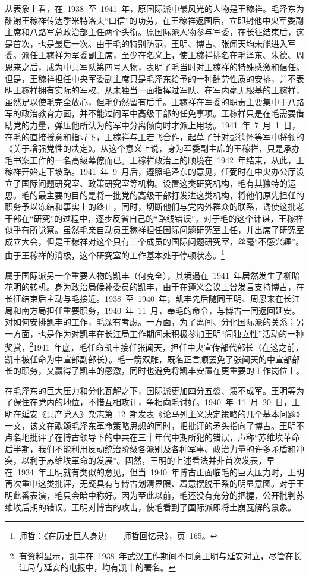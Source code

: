 从表象上看，在~1938~至~1941~年，原国际派中最风光的人物是王稼祥。毛泽东为酬谢王稼祥传达季米特洛夫“口信”的功劳，在王稼祥返国后，立即封他中央军委副主席和八路军总政治部主任两个头衔。原国际派人物参与军委，在长征结束后，这是首次，也是最后一次。由于毛的特别防范，王明、博古、张闻天均未能进入军委。派任王稼祥为军委副主席，至少在名义上，使王稼祥排名在毛泽东、朱德、周恩来之后，成为中共军队第四号人物，表明了毛当时对王稼祥的特殊感激和信任。但是，王稼祥担任中央军委副主席只是毛泽东给予的一种酬劳性质的安排，并不表明王稼祥拥有实际的军权。从未独当一面指挥过军队、在军内毫无根基的王稼祥，虽然足以使毛完全放心，但毛仍然留有后手。王稼祥在军委的职责主要集中于八路军的政治教育方面，并不能过问军中高级干部的任免事项。王稼祥只是在毛需要借助党的力量，弹压他所认为的军中分离倾向时才派上用场。1941~年~7~月~1~日，在毛的直接授意和指导下，王稼祥与王若飞合作，起草了针对彭德怀等军中将领的《关于增强党性的决定》。从这个意义上说，身为军委副主席的王稼祥，只是承办毛书案工作的一名高级幕僚而已。王稼祥政治上的顺境在~1942~年结束，从此，王稼祥开始走下坡路。1941~年~9~月后，遵照毛泽东的意见，任弼时在中央办公厅设立了国际问题研究室、政策研究室等机构。设置这类研究机构，毛有其独特的运思。毛的最主要的目的是将一批党的高级干部打发进这类机构，将他们原先担任的职务予以冻结和事实上的终止，同时，切断他们与党内外群众的联系，诱使这批老干部在“研究”的过程中，逐步反省自己的“路线错误”。对于毛的这个计谋，王稼祥似乎有所觉察。虽然毛亲自动员王稼祥担任国际问题研究室主任，并出席了研究室成立大会，但是王稼祥对这个只有三个成员的国际问题研究室，丝毫“不感兴趣”。由于王稼祥的消极，这个研究室的工作基本处于停顿状态。\footnote{师哲：《在历史巨人身边——师哲回忆录》，页~165。}

属于国际派另一个重要人物的凯丰（何克全），其境遇在~1941~年居然发生了柳暗花明的转机。身为政治局候补委员的凯丰，由于在遵义会议上曾发言支持博古，在长征结束后主动与毛接近。1938~至~1940~年，凯丰先后随同王明、周恩来在长江局和南方局担任重要职务，1940~年~11~月，奉毛的命令，与博古一同返回延安。对如何安排凯丰的工作，毛深有考虑。一方面，为了离间、分化国际派的关系；另一方面，也是作为对凯丰在长江局工作期间未积极参加王明“闹独立性”活动的一种奖赏，\footnote{有资料显示，凯丰在~1938~年武汉工作期间不同意王明与延安对立，尽管在长江局与延安的电报中，均有凯丰的署名。}1941~年底，毛任命凯丰接任张闻天，担任中央宣传部代部长（在这之前，凯丰被任命为中宣部副部长）。毛一箭双雕，既名正言顺罢免了张闻天的中宣部部长的职务，又赢得了凯丰的感激，同时也避免将凯丰安置在更重要的工作岗位上。

在毛泽东的巨大压力和分化瓦解之下，国际派更加四分五裂、溃不成军。王明等为了保住在党内的地位，不惜互相攻讦，争相向毛讨好。1940~年~11~月~20~日，王明在延安《共产党人》杂志第~12~期发表《论马列主义决定策略的几个基本问题》一文，该文在歌颂毛泽东革命策略思想的同时，把批评的矛头指向了博古。王明不点名地批评了在博古领导下的中共在三十年代中期所犯的错误，声称“苏维埃革命后半期，我们不能利用反动统治阶级各派别及各种军事、政治力量的许多矛盾和冲突，以利于苏维埃革命的发展”。固然，王明的上述看法并非首次发表，早在~1934~年王明就有类似的意见，但当~1940~年博古正面临毛的巨大压力时，王明再次重申这类批评，无疑具有与博古划清界限、着意摆脱干系的明显意图。对于王明此番表演，毛只会暗中称好。因为至此以前，毛还没有充分的把握，公开批判苏维埃后期的错误。王明对博古的攻击，使毛看到了国际派即将土崩瓦解的景象。

